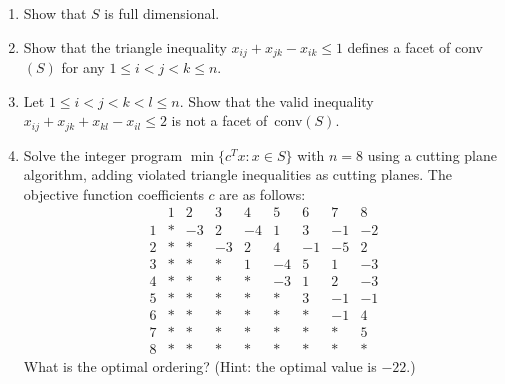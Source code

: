 \documentclass[11pt]{article}
\begin{document}
\begin{enumerate}
\item Show that $S$ is full dimensional.
\item Show that the triangle inequality $x_{ij} + x_{jk} - x_{ik}  \leq  1$
defines a facet of conv$(S)$ for any $1 \leq i < j < k \leq n $.
\item Let $1 \leq i < j < k < l \leq n$.
Show that the valid inequality $x_{ij} + x_{jk} + x_{kl} - x_{il} \leq 2$ is
not a facet of~conv$(S)$.
\item Solve the integer program $\min\{c^Tx : x \in S\}$ with $n=8$ using a cutting plane
algorithm, adding violated triangle inequalities as cutting planes.
The objective function coefficients $c$ are as follows:
\begin{displaymath}
\begin{array}{l|rrrrrrrr}
    & 1 & 2 & 3 & 4 & 5 & 6 & 7 & 8  \\  \hline
1  & * &-3 & 2 &-4 & 1 & 3 &-1 &-2  \\
2  & * & * &-3 & 2 & 4 &-1 &-5 & 2  \\
3  & * & * & * & 1 &-4 & 5 & 1 &-3  \\
4  & * & * & * & * &-3 & 1 & 2 &-3  \\
5  & * & * & * & * & * & 3 &-1 &-1  \\
6  & * & * & * & * & * & * &-1 & 4  \\
7  & * & * & * & * & * & * & * & 5  \\
8  & * & * & * & * & * & * & * & *
\end{array}
\end{displaymath}
What is the optimal ordering?
(Hint: the optimal value is $-22$.)


\end{enumerate}
\end{document}
